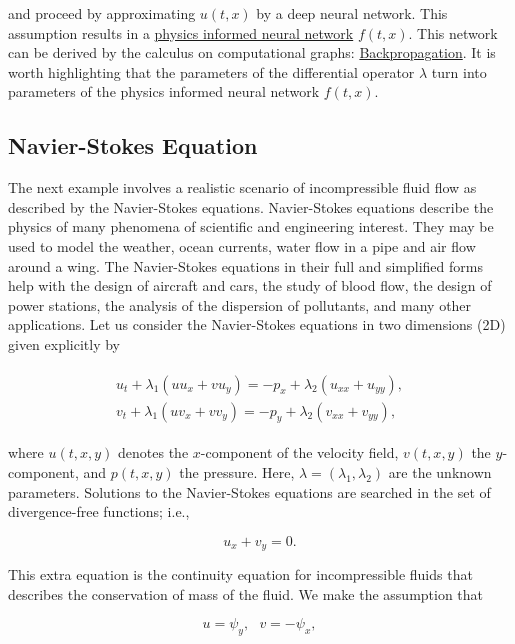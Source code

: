 \documentclass[book.tex]{subfiles}
\begin{document}
and proceed by approximating $u(t,x)$ by a deep neural network. This assumption results in a \href{https://arxiv.org/abs/1711.10566}{physics informed neural network} $f(t,x)$. This network can be derived by the calculus on computational graphs: \href{http://colah.github.io/posts/2015-08-Backprop/}{Backpropagation}. It is worth highlighting that the parameters of the differential operator $\lambda$ turn into parameters of the physics informed neural network $f(t,x)$.

\subsection{Navier-Stokes Equation}

The next example involves a realistic scenario of incompressible fluid flow as described by the Navier-Stokes equations. Navier-Stokes equations describe the physics of many phenomena of scientific and engineering interest. They may be used to model the weather, ocean currents, water flow in a pipe and air flow around a wing. The Navier-Stokes equations in their full and simplified forms help with the design of aircraft and cars, the study of blood flow, the design of power stations, the analysis of the dispersion of pollutants, and many other applications. Let us consider the Navier-Stokes equations in two dimensions (2D) given explicitly by


\begin{align}
\begin{split}
u_t + \lambda_1 (u u_x + v u_y) = -p_x + \lambda_2(u_{xx} + u_{yy}),\\
v_t + \lambda_1 (u v_x + v v_y) = -p_y + \lambda_2(v_{xx} + v_{yy}),    
\end{split}
\end{align}


where $u(t, x, y)$ denotes the $x$-component of the velocity field, $v(t, x, y)$ the $y$-component, and $p(t, x, y)$ the pressure. Here, $\lambda = (\lambda_1, \lambda_2)$ are the unknown parameters. Solutions to the Navier-Stokes equations are searched in the set of divergence-free functions; i.e.,

\begin{equation}
u_x + v_y = 0.    
\end{equation}


This extra equation is the continuity equation for incompressible fluids that describes the conservation of mass of the fluid. We make the assumption that

\begin{equation}
u = \psi_y,\ \ \ v = -\psi_x,    
\end{equation}
\end{document}
